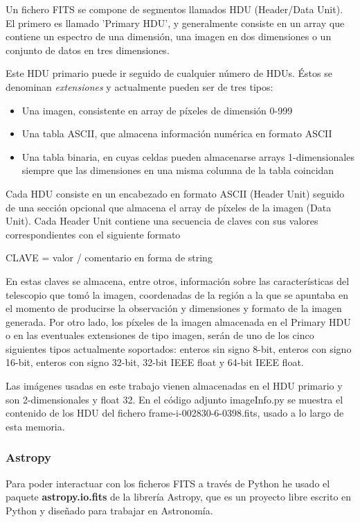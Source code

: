 \documentclass[a4paper,12pt]{article}
\begin{document}
Un fichero FITS se compone de segmentos llamados HDU (Header/Data Unit). El primero es llamado 'Primary HDU', y generalmente consiste en un array que contiene un espectro de una dimensión, una imagen en dos dimensiones o un conjunto de datos en tres dimensiones.

Este HDU primario puede ir seguido de cualquier número de HDUs. Éstos se denominan \textit{extensiones} y actualmente pueden ser de tres tipos:
\begin{itemize}
\item Una imagen, consistente en array de píxeles de dimensión 0-999
\item Una tabla ASCII, que almacena información numérica en formato ASCII
\item Una tabla binaria, en cuyas celdas pueden almacenarse arrays 1-dimensionales siempre que las dimensiones en una misma columna de la tabla coincidan
\end{itemize}
Cada HDU consiste en un encabezado en formato ASCII (Header Unit) seguido de una sección opcional que almacena el array de píxeles de la imagen (Data Unit). Cada Header Unit contiene una secuencia de claves con sus valores correspondientes con el siguiente formato
\begin{center}
CLAVE = valor / comentario en forma de string
\end{center}
En estas claves se almacena, entre otros, información sobre las características del telescopio que tomó la imagen, coordenadas de la región a la que se apuntaba en el momento de producirse la observación y dimensiones y formato de la imagen generada.
Por otro lado, los píxeles de la imagen almacenada en el Primary HDU o en las eventuales extensiones de tipo imagen, serán de uno de los cinco siguientes tipos actualmente soportados: enteros sin signo 8-bit, enteros con signo 16-bit, enteros con signo 32-bit, 32-bit IEEE float y 64-bit IEEE float.

Las imágenes usadas en este trabajo vienen almacenadas en el HDU primario y son 2-dimensionales y float 32. En el código adjunto imageInfo.py se muestra el contenido de los HDU del fichero frame-i-002830-6-0398.fits, usado a lo largo de esta memoria.
\subsubsection{Astropy}
Para poder interactuar con los ficheros FITS a través de Python he usado el paquete \textbf{astropy.io.fits} de la librería Astropy\cite{astropy}, que es un proyecto libre escrito en Python y diseñado para trabajar en Astronomía.
\end{document}
